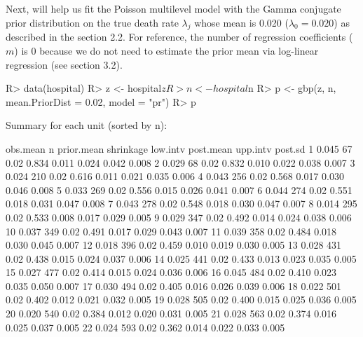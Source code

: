 \documentclass[article]{jss}
\begin{document}
Next,  will help us fit the Poisson multilevel model with the Gamma conjugate prior distribution on the true death rate $\lambda_{j}$ whose mean is 0.020 ($\lambda_{0}=0.020$) as described in the section 2.2. For reference, the number of regression coefficients ($m$) is 0 because we do not need to estimate the prior mean via log-linear regression (see section 3.2).
\begin{CodeChunk}
\begin{CodeInput}
R> data(hospital)
R> z <- hospital$z
R> n <- hospital$n
R> p <- gbp(z, n, mean.PriorDist = 0.02, model = "pr")
R> p
\end{CodeInput}
\begin{CodeOutput}
Summary for each unit (sorted by n):

         obs.mean    n prior.mean shrinkage low.intv post.mean upp.intv post.sd
1           0.045   67       0.02     0.834    0.011     0.024    0.042   0.008
2           0.029   68       0.02     0.832    0.010     0.022    0.038   0.007
3           0.024  210       0.02     0.616    0.011     0.021    0.035   0.006
4           0.043  256       0.02     0.568    0.017     0.030    0.046   0.008
5           0.033  269       0.02     0.556    0.015     0.026    0.041   0.007
6           0.044  274       0.02     0.551    0.018     0.031    0.047   0.008
7           0.043  278       0.02     0.548    0.018     0.030    0.047   0.007
8           0.014  295       0.02     0.533    0.008     0.017    0.029   0.005
9           0.029  347       0.02     0.492    0.014     0.024    0.038   0.006
10          0.037  349       0.02     0.491    0.017     0.029    0.043   0.007
11          0.039  358       0.02     0.484    0.018     0.030    0.045   0.007
12          0.018  396       0.02     0.459    0.010     0.019    0.030   0.005
13          0.028  431       0.02     0.438    0.015     0.024    0.037   0.006
14          0.025  441       0.02     0.433    0.013     0.023    0.035   0.005
15          0.027  477       0.02     0.414    0.015     0.024    0.036   0.006
16          0.045  484       0.02     0.410    0.023     0.035    0.050   0.007
17          0.030  494       0.02     0.405    0.016     0.026    0.039   0.006
18          0.022  501       0.02     0.402    0.012     0.021    0.032   0.005
19          0.028  505       0.02     0.400    0.015     0.025    0.036   0.005
20          0.020  540       0.02     0.384    0.012     0.020    0.031   0.005
21          0.028  563       0.02     0.374    0.016     0.025    0.037   0.005
22          0.024  593       0.02     0.362    0.014     0.022    0.033   0.005

\end{CodeOutput}
\end{CodeChunk}
\end{document}
